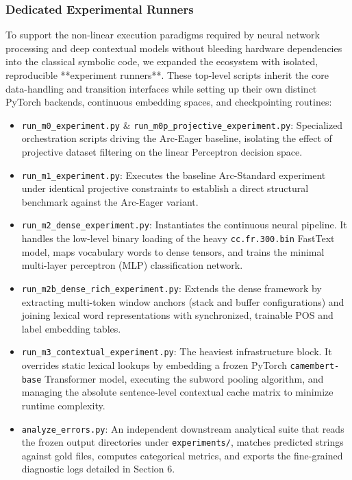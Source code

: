 \documentclass[12pt,a4paper]{article}
\begin{document}
\subsubsection{Dedicated Experimental Runners}
To support the non-linear execution paradigms required by neural network processing and deep contextual models without bleeding hardware dependencies into the classical symbolic code, we expanded the ecosystem with isolated, reproducible **experiment runners**. These top-level scripts inherit the core data-handling and transition interfaces while setting up their own distinct PyTorch backends, continuous embedding spaces, and checkpointing routines:

\begin{itemize}
    \item \texttt{run\_m0\_experiment.py} \& \texttt{run\_m0p\_projective\_experiment.py}: Specialized orchestration scripts driving the Arc-Eager baseline, isolating the effect of projective dataset filtering on the linear Perceptron decision space.
    \item \texttt{run\_m1\_experiment.py}: Executes the baseline Arc-Standard experiment under identical projective constraints to establish a direct structural benchmark against the Arc-Eager variant.
    \item \texttt{run\_m2\_dense\_experiment.py}: Instantiates the continuous neural pipeline. It handles the low-level binary loading of the heavy \texttt{cc.fr.300.bin} FastText model, maps vocabulary words to dense tensors, and trains the minimal multi-layer perceptron (MLP) classification network.
    \item \texttt{run\_m2b\_dense\_rich\_experiment.py}: Extends the dense framework by extracting multi-token window anchors (stack and buffer configurations) and joining lexical word representations with synchronized, trainable POS and label embedding tables.
    \item \texttt{run\_m3\_contextual\_experiment.py}: The heaviest infrastructure block. It overrides static lexical lookups by embedding a frozen PyTorch \texttt{camembert-base} Transformer model, executing the subword pooling algorithm, and managing the absolute sentence-level contextual cache matrix to minimize runtime complexity.
    \item \texttt{analyze\_errors.py}: An independent downstream analytical suite that reads the frozen output directories under \texttt{experiments/}, matches predicted strings against gold files, computes categorical metrics, and exports the fine-grained diagnostic logs detailed in Section 6.
\end{itemize}
\end{document}
